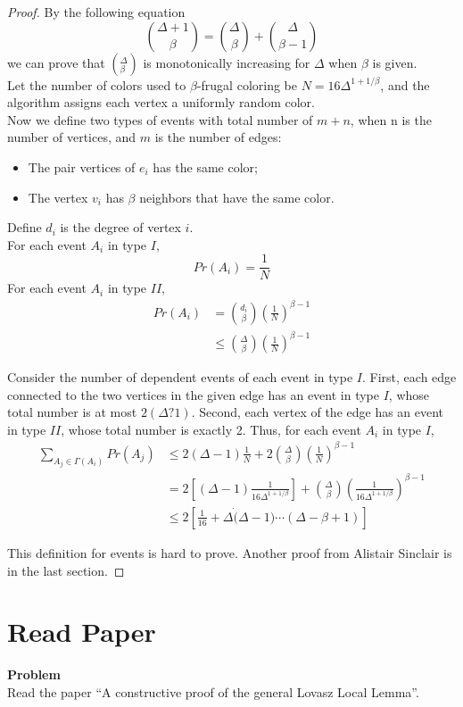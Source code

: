 	\begin{proof}
		By the following equation
	\begin{equation*}
		\binom{\Delta + 1}{\beta} = \binom{\Delta}{\beta} + \binom{\Delta}{\beta - 1}
	\end{equation*}
	we can prove that $({}_\beta^\Delta)$ is monotonically increasing for $\Delta$ when $\beta$ is given.\\
	Let the number of colors used to $\beta$-frugal coloring be $N=16\Delta^{1+1/\beta}$, and the algorithm assigns each vertex a uniformly random color.\\
	Now we define two types of events with total number of $m + n$, when n is the number of vertices, and $m$ is the number of edges:
	\begin{itemize}
		\item The pair vertices of $e_i$ has the same color;
		\item The vertex $v_i$ has $\beta$ neighbors that have the same color.
	\end{itemize}
	Define $d_i$ is the degree of vertex $i$.\\
	For each event $A_i$ in type $I$,
	\begin{equation*}
		Pr(A_i)=\frac{1}{N}
	\end{equation*}
	For each event $A_i$ in type $II$,
	\begin{equation*}
		\begin{split}
			Pr(A_i) &= \binom{d_i}{\beta} \left(\frac{1}{N} \right)^{\beta-1}\\
			&\le \binom{\Delta}{\beta} \left(\frac{1}{N} \right)^{\beta-1}
		\end{split}
	\end{equation*}
	
	Consider the number of dependent events of each event in type $I$. First, each edge connected to the two vertices in the given edge has an event in type $I$, whose total number is at most $2(\Delta ? 1)$. Second, each vertex of the edge has an event in type $II$, whose total number is exactly 2. Thus, for each event $A_i$ in type $I$,
	\begin{equation*}
		\begin{split}
			\sum_{A_j \in \Gamma(A_i)} Pr(A_j) &\le 2(\Delta-1)\frac{1}{N} + 2\binom{\Delta}{\beta} \left(\frac{1}{N} \right)^{\beta-1}\\
			&= 2 \left[(\Delta-1)\frac{1}{16\Delta^{1+1/\beta}} \right] + \binom{\Delta}{\beta}  \left(\frac{1}{16\Delta^{1+1/\beta}} \right)^{\beta-1}\\
			&\le 2 \left[\frac{1}{16} + \Delta \dot (\Delta-1) \cdots (\Delta-\beta+1) \right]
		\end{split}
	\end{equation*}
	
	This definition for events is hard to prove. Another proof from Alistair Sinclair is in the last section.
	\end{proof}
	
	\section{Read Paper}
	\textbf{Problem}\\
	Read the paper ``A constructive proof of the general Lovasz Local Lemma''.\\

